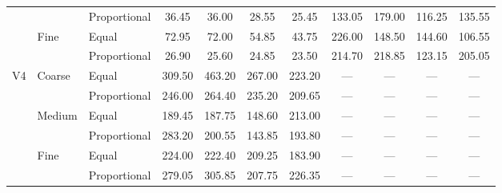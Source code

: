 \documentclass[10pt,journal,compsoc]{IEEEtran}
\begin{document}
\begin{table}
\begin{tabular}{|c|l|l|c|c|c|c|c|c|c|c|}
		&					& Proportional	& 36.45	& 36.00	& 28.55	& 25.45	& 133.05	& 179.00	& 116.25	& 135.55	\\ \cline{2-11}
		& Fine		& Equal					& 72.95	& 72.00	& 54.85	& 43.75	& 226.00	& 148.50	& 144.60	& 106.55	\\ \cline{3-11}
		&					& Proportional	& 26.90	& 25.60	& 24.85	& 23.50	& 214.70	& 218.85	& 123.15	& 205.05	\\ \hline
V4	& Coarse	& Equal					& 309.50	& 463.20	& 267.00	& 223.20	& ---	& ---	& ---	& ---	\\ \cline{3-11}
		&					& Proportional	& 246.00	& 264.40	& 235.20	& 209.65	& ---	& ---	& ---	& ---	\\ \cline{2-11}
		& Medium	& Equal					& 189.45	& 187.75	& 148.60	& 213.00	& ---	& ---	& ---	& ---	\\ \cline{3-11}
		&					& Proportional	& 283.20	& 200.55	& 143.85	& 193.80	& ---	& ---	& ---	& ---	\\ \cline{2-11}
		& Fine		& Equal					& 224.00	& 222.40	& 209.25	& 183.90	& ---	& ---	& ---	& ---	\\ \cline{3-11}
		&					& Proportional	& 279.05	& 305.85	& 207.75	& 226.35	& ---	& ---	& ---	& ---	\\ \hline
\end{tabular}
\end{table}
\end{document}
